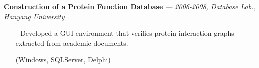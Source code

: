   \vspace{-0.15in}
  {\bf Construction of a Protein Function Database} 
    {\it \footnotesize --- 2006-2008, Database Lab., Hanyang University}
    \begin{itemize}[leftmargin=*]
    \setlength\itemsep{-0.02in}
    \item[-] Developed a GUI environment that verifies protein interaction graphs extracted
    from academic documents.
    \item[] {\small(Windows, SQLServer, Delphi)}
    \end{itemize}

